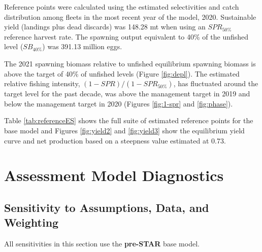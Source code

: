 \documentclass[11pt,
  english,
]{article}
\begin{document}
\leavevmode\tagmcend\tagstructend

Reference points were calculated using the estimated selectivities and catch distribution among fleets in the most recent year of the model, 2020. Sustainable yield (landings plus dead discards) was 148.28 mt when using an {\(SPR_{50\%}\)\leavevmode\tagmcend\tagstructend} reference harvest rate. The spawning output equivalent to 40\% of the unfished level ({\(SB_{40\%}\)\leavevmode\tagmcend\tagstructend}) was 391.13 million eggs.

The 2021 spawning biomass relative to unfished equilibrium spawning biomass is above the target of 40\% of unfished levels (Figure \ref{fig:depl}). The estimated relative fishing intensity, {\((1-SPR)/(1-SPR_{50\%})\)\leavevmode\tagmcend\tagstructend}, has fluctuated around the target level for the past decade, was above the management target in 2019 and below the management target in 2020 (Figures \ref{fig:1-spr} and \ref{fig:phase}).

Table \ref{tab:referenceES} shows the full suite of estimated reference points for the base model and Figures \ref{fig:yield2} and \ref{fig:yield3} show the equilibrium yield curve and net production based on a steepness value estimated at 0.73.


\hypertarget{assessment-model-diagnostics}{%
\section{Assessment Model Diagnostics}\label{assessment-model-diagnostics}}

\leavevmode\tagmcend\tagstructend


\hypertarget{sensitivity-to-assumptions-data-and-weighting}{%
\subsection{Sensitivity to Assumptions, Data, and Weighting}\label{sensitivity-to-assumptions-data-and-weighting}}

\leavevmode\tagmcend\tagstructend

All sensitivities in this section use the \textbf{pre-STAR} base model.
\end{document}
